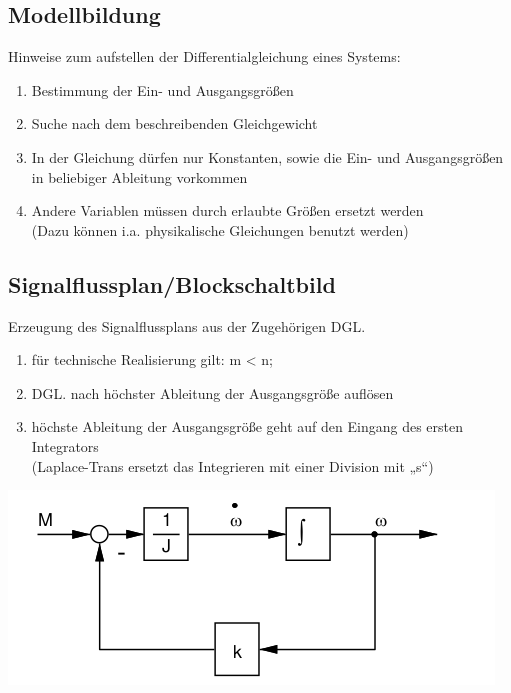 \documentclass[10pt,a4paper]{article}
\begin{document}
\subsection{Modellbildung}
Hinweise zum aufstellen der Differentialgleichung eines Systems:
\begin{mdframed}[style=exercise]
	\begin{enumerate}
		\item Bestimmung der Ein- und Ausgangsgrößen
		\item Suche nach dem beschreibenden Gleichgewicht
		\item In der Gleichung dürfen nur Konstanten, sowie die Ein- und
		      Ausgangsgrößen in beliebiger Ableitung vorkommen
		\item Andere Variablen müssen durch erlaubte Größen ersetzt werden\\
		      \footnotesize
		      (Dazu können i.a. physikalische Gleichungen benutzt werden)
	\end{enumerate}
\end{mdframed}

\subsection{Signalflussplan/Blockschaltbild}
Erzeugung des Signalflussplans aus der Zugehörigen DGL.
\begin{mdframed}[style=exercise]
	\begin{enumerate}
		\item für technische Realisierung gilt: m < n;

		\item DGL. nach höchster Ableitung der Ausgangsgröße auflösen

		\item höchste Ableitung der Ausgangsgröße geht auf den Eingang des ersten Integrators\\
		      \footnotesize
		      (Laplace-Trans ersetzt das Integrieren mit einer Division mit „s“)
	\end{enumerate}
\end{mdframed}
\begin{center}
	\includegraphics[width=0.96\columnwidth]{Figures/Signalflussplan12.png}
\end{center}
\end{document}
